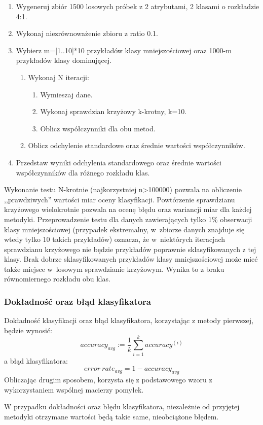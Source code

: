 \begin{enumerate}
	\item Wygeneruj zbiór 1500 losowych próbek z 2 atrybutami, 2 klasami o rozkładzie 4:1.
	\item Wykonaj niezrównoważenie zbioru z ratio 0.1.
	\item Wybierz m=[1..10]*10 przykładów klasy mniejszościowej oraz 1000-m przykładów klasy dominującej.
	\begin{enumerate}
		\item  Wykonaj N iteracji:
		\begin{enumerate}
			\item Wymieszaj dane.
			\item Wykonaj sprawdzian krzyżowy k-krotny, k=10.
			\item Oblicz współczynniki dla obu metod.
		\end{enumerate}
		\item Oblicz odchylenie standardowe oraz średnie wartości współczynników.
	\end{enumerate}
	\item Przedstaw wyniki odchylenia standardowego oraz średnie wartości współczynników dla różnego rozkładu klas.
\end{enumerate}
Wykonanie testu N-krotnie (najkorzystniej n>100000) pozwala na obliczenie ,,prawdziwych'' wartości miar oceny klasyfikacji. Powtórzenie sprawdzianu krzyżowego wielokrotnie pozwala na ocenę błędu oraz wariancji miar dla każdej metodyki. Przeprowadzenie testu dla danych zawierających tylko 1\% obserwacji klasy mniejszościowej (przypadek ekstremalny, w~zbiorze danych znajduje się wtedy tylko 10 takich przykładów) oznacza, że w~niektórych iteracjach sprawdzianu krzyżowego nie będzie przykładów poprawnie sklasyfikowanych z tej klasy. Brak dobrze sklasyfikowanych przykładów klasy mniejszościowej może mieć także miejsce w~losowym sprawdzianie krzyżowym. Wynika to z braku równomiernego rozkładu obu klas. 
\subsubsection{Dokładność oraz błąd klasyfikatora}
Dokładność klasyfikacji oraz błąd klasyfikatora, korzystając z metody pierwszej, będzie wynosić:
\[accuracy_{avg} := \frac{1}{k} \sum_{i=1}^{k} accuracy^{(i)}\]
a błąd klasyfikatora:
\[error\ rate_{avg} = 1 - accuracy_{avg}\]
Obliczając drugim sposobem, korzysta się z podstawowego wzoru z wykorzystaniem wspólnej macierzy pomyłek. \par
W przypadku dokładności oraz błędu klasyfikatora, niezależnie od przyjętej metodyki otrzymane wartości będą takie same, nieobciążone błędem.

